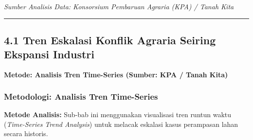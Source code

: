 \documentclass[
]{article}
\begin{document}
\emph{Sumber Analisis Data: Konsorsium Pembaruan Agraria (KPA) / Tanah
Kita}

\begin{center}\rule{0.5\linewidth}{0.5pt}\end{center}

\subsection{4.1 Tren Eskalasi Konflik Agraria Seiring Ekspansi
Industri}\label{tren-eskalasi-konflik-agraria-seiring-ekspansi-industri}

\textbf{Metode: Analisis Tren Time-Series (Sumber: KPA / Tanah Kita)}

\subsubsection{Metodologi: Analisis Tren
Time-Series}\label{metodologi-analisis-tren-time-series}

\textbf{Metode Analisis:} Sub-bab ini menggunakan visualisasi tren
runtun waktu (\emph{Time-Series Trend Analysis}) untuk melacak eskalasi
kasus perampasan lahan secara historis.
\end{document}
